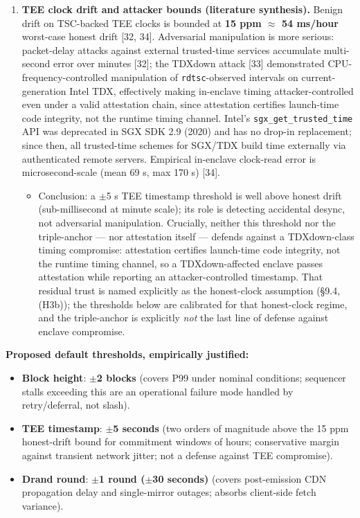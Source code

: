 \documentclass[11pt]{article}
\begin{document}
\begin{enumerate}
\item \textbf{TEE clock drift and attacker bounds (literature synthesis).} Benign drift on TSC-backed TEE clocks is bounded at \textbf{15 ppm $\approx$ 54 ms/hour} worst-case honest drift [32, 34]. Adversarial manipulation is more serious: packet-delay attacks against external trusted-time services accumulate multi-second error over minutes [32]; the TDXdown attack [33] demonstrated CPU-frequency-controlled manipulation of \texttt{rdtsc}-observed intervals on current-generation Intel TDX, effectively making in-enclave timing attacker-controlled even under a valid attestation chain, since attestation certifies launch-time code integrity, not the runtime timing channel. Intel's \texttt{sgx\_get\_trusted\_time} API was deprecated in SGX SDK 2.9 (2020) and has no drop-in replacement; since then, all trusted-time schemes for SGX/TDX build time externally via authenticated remote servers. Empirical in-enclave clock-read error is microsecond-scale (mean 69 \textmu{}s, max 170 \textmu{}s) [34].
\begin{itemize}
\item Conclusion: a $\pm$5 s TEE timestamp threshold is well above honest drift (sub-millisecond at minute scale); its role is detecting accidental desync, not adversarial manipulation. Crucially, neither this threshold nor the triple-anchor --- nor attestation itself --- defends against a TDXdown-class timing compromise: attestation certifies launch-time code integrity, not the runtime timing channel, so a TDXdown-affected enclave passes attestation while reporting an attacker-controlled timestamp. That residual trust is named explicitly as the honest-clock assumption (\S9.4, (H3b)); the thresholds below are calibrated for that honest-clock regime, and the triple-anchor is explicitly \emph{not} the last line of defense against enclave compromise.
\end{itemize}
\end{enumerate}

\textbf{Proposed default thresholds, empirically justified:}

\begin{itemize}
\item \textbf{Block height}: \textbf{$\pm$2 blocks} (covers P99 under nominal conditions; sequencer stalls exceeding this are an operational failure mode handled by retry/deferral, not slash).
\item \textbf{TEE timestamp}: \textbf{$\pm$5 seconds} (two orders of magnitude above the 15 ppm honest-drift bound for commitment windows of hours; conservative margin against transient network jitter; not a defense against TEE compromise).
\item \textbf{Drand round}: \textbf{$\pm$1 round ($\pm$30 seconds)} (covers post-emission CDN propagation delay and single-mirror outages; absorbs client-side fetch variance).
\end{itemize}
\end{document}
